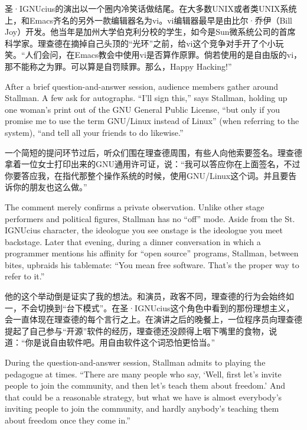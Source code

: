 \ifdefined\chs
圣·IGNUcius的演出以一个圈内冷笑话做结尾。在大多数UNIX或者类UNIX系统上，和Emacs齐名的另外一款编辑器名为vi。vi编辑器最早是由比尔·乔伊（Bill Joy）开发。他当年是加州大学伯克利分校的学生，如今是Sun微系统公司的首席科学家。理查德在摘掉自己头顶的“光环”之前，给vi这个竞争对手开了个小玩笑。“人们会问，在Emacs教会中使用vi是否算作原罪。倘若使用的是自由版的vi，那不能称之为罪。可以算是自罚赎罪。那么，Happy Hacking!”
\fi

\ifdefined\eng
After a brief question-and-answer session, audience members gather around Stallman. A few ask for autographs. ``I'll sign this,'' says Stallman, holding up one woman's print out of the GNU General Public License, ``but only if you promise me to use the term GNU/Linux instead of Linux'' (when referring to the system), ``and tell all your friends to do likewise.''
\fi

\ifdefined\chs
一个简短的提问环节过后，听众们围在理查德周围，有些人向他索要签名。理查德拿着一位女士打印出来的GNU通用许可证，说：“我可以答应你在上面签名，不过你要答应我，在指代那整个操作系统的时候，使用GNU/Linux这个词。并且要告诉你的朋友也这么做。”
\fi

\ifdefined\eng
The comment merely confirms a private observation. Unlike other stage performers and political figures, Stallman has no ``off'' mode. Aside from the St. IGNUcius character, the ideologue you see onstage is the ideologue you meet backstage. Later that evening, during a dinner conversation in which a programmer mentions his affinity for ``open source'' programs, Stallman, between bites, upbraids his tablemate: ``You mean free software. That's the proper way to refer to it.''
\fi

\ifdefined\chs
他的这个举动倒是证实了我的想法。和演员，政客不同，理查德的行为会始终如一，不会切换到“台下模式”。在圣·IGNUcius这个角色中看到的那份理想主义，会一直体现在理查德的每个言行之上。在演讲之后的晚餐上，一位程序员向理查德提起了自己参与“开源”软件的经历，理查德还没顾得上咽下嘴里的食物，说道：“你是说自由软件吧。用自由软件这个词恐怕更恰当。”
\fi

\ifdefined\eng
During the question-and-answer session, Stallman admits to playing the pedagogue at times. ``There are many people who say, `Well, first let's invite people to join the community, and then let's teach them about freedom.' And that could be a reasonable strategy, but what we have is almost everybody's inviting people to join the community, and hardly anybody's teaching them about freedom once they come in.''
\fi

